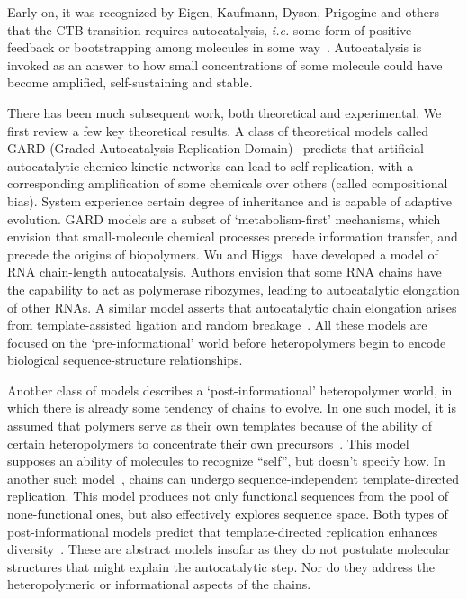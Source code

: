 \documentclass[journal=jacsat,manuscript=article,layout=twocolumn]{achemso}
\begin{document}
 Early on, it was recognized by Eigen, Kaufmann, Dyson, Prigogine and others that the CTB transition 
requires autocatalysis, \emph{i.e.} some form of positive feedback or bootstrapping among molecules 
in some 
way~\cite{eigen1971selforganization,Eigen1977,Eigen1978,Dyson1985,Prigogine1989,Kauffman1986}.  
Autocatalysis is invoked as an answer to how small concentrations of some molecule could have become 
amplified, self-sustaining and stable.
 
 There has been much subsequent work, both theoretical and experimental.  We first review a few key 
theoretical results.  A class of theoretical models called GARD (Graded Autocatalysis Replication 
Domain)~\cite{segre1998graded,Segre2000,Markovitch2012} predicts that artificial autocatalytic 
chemico-kinetic networks can lead to self-replication, with a corresponding amplification of some 
chemicals over others (called compositional bias). System experience certain degree of inheritance 
and is capable of adaptive evolution.  GARD models are a subset of `metabolism-first' mechanisms, 
which envision that small-molecule chemical processes precede information transfer, and precede the 
origins of biopolymers.  Wu and Higgs~\cite{Wu2009} have developed a model of RNA chain-length 
autocatalysis.  Authors envision that some RNA chains have the capability to act as polymerase 
ribozymes, leading to autocatalytic elongation of other RNAs.  A similar model asserts that 
autocatalytic chain elongation arises from template-assisted ligation and random 
breakage~\cite{Tkachenko2014}.  All these models are focused on the `pre-informational' world before 
heteropolymers begin to encode biological sequence-structure relationships.  
 
 Another class of models describes a `post-informational' heteropolymer world, in which there is 
already some tendency of chains to evolve.  In one such model, it is assumed that polymers serve as 
their own templates because of the ability of certain heteropolymers to concentrate their own 
precursors~\cite{nowak2008prevolutionary,Ohtsuki2009,Chen2012,Derr2012}.  This model supposes an 
ability of molecules to recognize ``self'', but doesn't specify how.  In another such 
model~\cite{Walker2012}, chains can undergo sequence-independent template-directed replication.  
This model produces not only functional sequences from the pool of none-functional ones, but also 
effectively explores sequence space.  Both types of post-informational models predict that 
template-directed replication enhances diversity~\cite{Derr2012}.   These are abstract
models insofar as they do not postulate molecular structures that might explain the autocatalytic 
step. Nor do they address the heteropolymeric or informational aspects of the chains.
 
\end{document}
